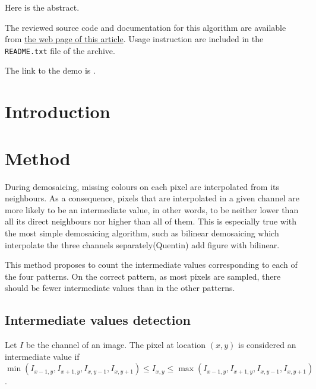 \documentclass{ipol}
\newcommand{\qb}[1]{\textcolor{c1}{(Quentin) #1}}
\begin{document}
\begin{ipolAbstract}
Here is the abstract.
\end{ipolAbstract}

\begin{ipolCode}
The reviewed source code and documentation for this algorithm are
available from \href{\ipolLink}{the web page of this
article}. Usage instruction are included in the
\verb|README.txt| file of the archive.
\end{ipolCode}

\begin{ipolSupp}
The link to the demo is \href{}{}.
\end{ipolSupp}

\newpage

\section{Introduction}

\section{Method}
During demosaicing, missing colours on each pixel are interpolated from its neighbours. As a consequence, pixels that are interpolated in a given channel are more likely to be an intermediate value, in other words, to be neither lower than all its direct neighbours nor higher than all of them. This is especially true with the most simple demosaicing algorithm, such as bilinear demosaicing which interpolate the three channels separately\qb{add figure with bilinear}.

This method proposes to count the intermediate values corresponding to each of the four patterns. On the correct pattern, as most pixels are sampled, there should be fewer intermediate values than in the other patterns.

\subsection{Intermediate values detection}
Let $I$ be the channel of an image. The pixel at location $(x, y)$ is considered an intermediate value if $\min(I_{x-1, y}, I_{x+1, y}, I_{x, y-1}, I_{x, y+1}) \leq I_{x, y} \leq \max(I_{x-1, y}, I_{x+1, y}, I_{x, y-1}, I_{x, y+1})$.
\end{document}
